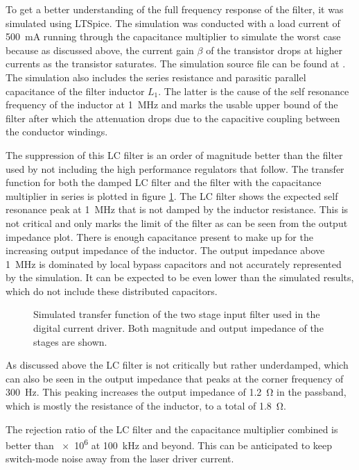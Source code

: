 To get a better understanding of the full frequency response of the filter, it was simulated using LTSpice. The simulation was conducted with a load current of \qty{500}{\mA} running through the capacitance multiplier to simulate the worst case because as discussed above, the current gain $\beta$ of the transistor drops at higher currents as the transistor saturates. The simulation source file can be found at . The simulation also includes the series resistance and parasitic parallel capacitance of the filter inductor $L_1$. The latter is the cause of the self resonance frequency of the inductor at \qty{1}{\MHz} and marks the usable upper bound of the filter after which the attenuation drops due to the capacitive coupling between the conductor windings.

The suppression of this LC filter is an order of magnitude better than the filter used by \citeauthor{libbrecht_hall} not including the high performance regulators that follow. The transfer function for both the damped LC filter and the filter with the capacitance multiplier in series is plotted in figure \ref{fig:laser_driver_input_filter}. The LC filter shows the expected self resonance peak at \qty{1}{\MHz} that is not damped by the inductor resistance. This is not critical and only marks the limit of the filter as can be seen from the output impedance plot. There is enough capacitance present to make up for the increasing output impedance of the inductor. The output impedance above \qty{1}{\MHz} is dominated by local bypass capacitors and not accurately represented by the simulation. It can be expected to be even lower than the simulated results, which do not include these distributed capacitors.
\begin{figure}[ht]
    \centering
    
    \caption{Simulated transfer function of the two stage input filter used in the digital current driver. Both magnitude and output impedance of the stages are shown.}
    \label{fig:laser_driver_input_filter}
\end{figure}

As discussed above the LC filter is not  critically but rather underdamped, which can also be seen in the output impedance that peaks at the corner frequency of \qty{300}{\Hz}. This peaking increases the output impedance of \qty{1.2}{\ohm} in the passband, which is mostly the resistance of the inductor, to a total of \qty{1.8}{\ohm}.

The rejection ratio of the LC filter and the capacitance multiplier combined is better than \num{e6} at \qty{100}{\kHz} and beyond. This can be anticipated to keep switch-mode noise away from the laser driver current.

